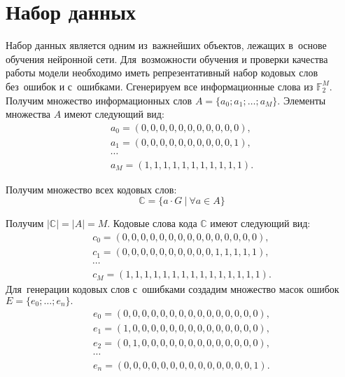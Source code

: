 \section{Набор данных}

Набор данных является одним из~важнейших объектов, лежащих в~основе обучения нейронной сети. Для~возможности обучения и проверки качества работы модели необходимо иметь репрезентативный\cite{bib:representative_data_sets} набор кодовых слов без~ошибок и с~ошибками.
Сгенерируем все информационные слова из $\mathbb{F}_2^M$. Получим множество информационных слов $A = \{a_0; a_1; \dots; a_M\}$. Элементы множества $A$ имеют следующий вид:
\begin{gather}
  \nonumber a_0 = (0, 0, 0, 0, 0, 0, 0, 0, 0, 0, 0), \\
  \nonumber a_1 = (0, 0, 0, 0, 0, 0, 0, 0, 0, 0, 1), \\
  \nonumber \cdots \\
  \nonumber a_M = (1, 1, 1, 1, 1, 1, 1, 1, 1, 1, 1).
\end{gather}

Получим множество всех кодовых слов:
\begin{equation*}
  \mathbb{C} = \{a\cdot G~|~\forall a \in A \}
\end{equation*}

Получим $|\mathbb{C}| = |A| = M$. Кодовые слова кода $\mathbb{C}$ имеют следующий вид:
\begin{gather}
    \nonumber c_0 = (0, 0, 0, 0, 0, 0, 0, 0, 0, 0, 0, 0, 0, 0, 0), \\
    \nonumber c_1 = (0, 0, 0, 0, 0, 0, 0, 0, 0, 0, 1, 1, 1, 1, 1), \\
    \nonumber \cdots \\
    \nonumber c_M = (1, 1, 1, 1, 1, 1, 1, 1, 1, 1, 1, 1, 1, 1, 1).
\end{gather}
\newpage
Для~генерации кодовых слов с~ошибками создадим множество масок ошибок $E = \{e_0; \dots; e_n\}.$
\begin{gather}
    \nonumber e_0 = (0, 0, 0, 0, 0, 0, 0, 0, 0, 0, 0, 0, 0, 0, 0), \\
    \nonumber e_1 = (1, 0, 0, 0, 0, 0, 0, 0, 0, 0, 0, 0, 0, 0, 0), \\
    \nonumber e_2 = (0, 1, 0, 0, 0, 0, 0, 0, 0, 0, 0, 0, 0, 0, 0), \\
    \nonumber \cdots                                                \\
    \nonumber e_n = (0, 0, 0, 0, 0, 0, 0, 0, 0, 0, 0, 0, 0, 0, 1).
\end{gather}

